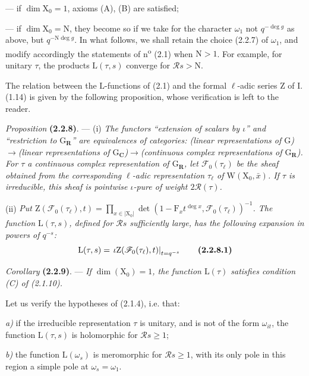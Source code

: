 \documentclass[11pt,leqno]{article}
\begin{document}
— if \(\dim\mathrm X_0=1\), axioms (A), (B) are satisfied;

— if \(\dim\mathrm X_0=\mathrm N\), they become so if we take for the character \(\omega_1\) not \(q^{-\deg g}\) as above, but \(q^{-\mathrm N\deg g}\). In what follows, we shall retain the choice (2.2.7) of \(\omega_1\), and modify accordingly the statements of n\textsuperscript{o} (2.1) when \(\mathrm N>1\). For example, for unitary \(\tau\), the products \(\mathrm L(\tau,s)\) converge for \(\mathscr R s>\mathrm N\).

The relation between the \(\mathrm L\)-functions of (2.1) and the formal \(\ell\)-adic series \(\mathrm Z\) of I.\,(1.14) is given by the following proposition, whose verification is left to the reader.

\textit{Proposition} \textbf{(2.2.8)}. — (i) \textit{The functors “extension of scalars by \(\iota\)” and “restriction to \(\mathrm G_{\mathbf R}\)” are equivalences of categories: (linear representations of \(\mathrm G\))\(\to\)(linear representations of \(\mathrm G_{\mathbf C}\))\(\to\)(continuous complex representations of \(\mathrm G_{\mathbf R}\)). For \(\tau\) a continuous complex representation of \(\mathrm G_{\mathbf R}\), let \(\mathscr F_0(\tau_\ell)\) be the sheaf obtained from the corresponding \(\ell\)-adic representation \(\tau_\ell\) of \(\mathrm W(\mathrm X_0,\bar{x})\). If \(\tau\) is irreducible, this sheaf is pointwise \(\iota\)-pure of weight \(2\mathscr R(\tau)\).}

(ii) \textit{Put \(\mathrm Z(\mathscr F_0(\tau_\ell),t)=\prod\limits_{x\in|\mathrm X_0|}\det(1-\mathrm F_xt^{\deg x},\mathscr F_0(\tau_\ell))^{-1}\). The function \(\mathrm L(\tau,s)\), defined for \(\mathscr R s\) sufficiently large, has the following expansion in powers of \(q^{-s}\):}
\[
\mathrm L(\tau,s)
=\left.\iota\mathrm Z(\mathscr F_0(\tau_\ell),t)\right|_{t=q^{-s}}
\tag*{\textbf{(2.2.8.1)}}
\]

\textit{Corollary} \textbf{(2.2.9)}. — \textit{If \(\dim(\mathrm X_0)=1\), the function \(\mathrm L(\tau)\) satisfies condition \textup{(C)} of \textup{(2.1.10)}.}

Let us verify the hypotheses of (2.1.4), i.e. that:

\textit{a)} if the irreducible representation \(\tau\) is unitary, and is not of the form \(\omega_{it}\), the function \(\mathrm L(\tau,s)\) is holomorphic for \(\mathscr R s\geq1\);

\textit{b)} the function \(\mathrm L(\omega_s)\) is meromorphic for \(\mathscr R s\geq1\), with its only pole in this region a simple pole at \(\omega_s=\omega_1\).
\end{document}

